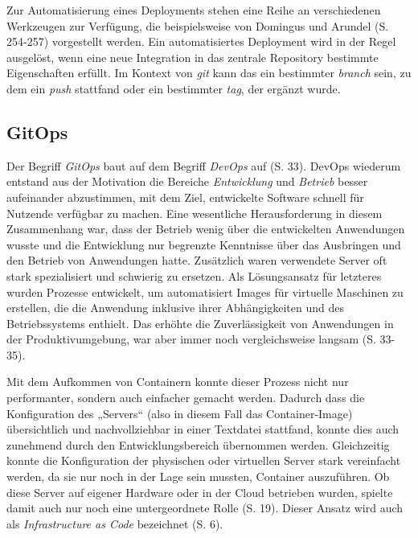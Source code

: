 \documentclass[11pt,a4paper]{article}
\begin{document}
Zur Automatisierung eines Deployments stehen eine Reihe an verschiedenen Werkzeugen
zur Verfügung, die beispielsweise von Domingus und Arundel \cite{domingus2022cloud} (S. 254-257)
vorgestellt werden. Ein automatisiertes Deployment wird in der Regel ausgelöst,
wenn eine neue Integration in das zentrale Repository bestimmte Eigenschaften erfüllt.
Im Kontext von \emph{git} kann das ein bestimmter \emph{branch} sein, zu dem
ein \emph{push} stattfand oder ein bestimmter \emph{tag}, der ergänzt wurde.

\subsection{GitOps}
Der Begriff \emph{GitOps} baut auf dem Begriff \emph{DevOps} auf \cite{cicd_with_kubernetes_devops} (S. 33).
DevOps wiederum entstand aus der Motivation die Bereiche \emph{Entwicklung} und \emph{Betrieb}
besser aufeinander abzustimmen, mit dem Ziel, entwickelte Software schnell
für Nutzende verfügbar zu machen. Eine wesentliche Herausforderung in diesem Zusammenhang
war, dass der Betrieb wenig über die entwickelten Anwendungen wusste und
die Entwicklung nur begrenzte Kenntnisse über das Ausbringen und den Betrieb von Anwendungen hatte.
Zusätzlich waren verwendete Server oft stark spezialisiert und schwierig zu ersetzen.
Als Lösungsansatz für letzteres wurden Prozesse entwickelt, um automatisiert Images
für virtuelle Maschinen zu erstellen, die die Anwendung inklusive ihrer Abhängigkeiten
und des Betriebssystems enthielt. Das erhöhte die Zuverlässigkeit von
Anwendungen in der Produktivumgebung, war aber immer noch vergleichsweise langsam \cite{cicd_with_kubernetes_devops} (S. 33-35).

Mit dem Aufkommen von Containern konnte dieser Prozess nicht nur performanter, sondern
auch einfacher gemacht werden. Dadurch dass die Konfiguration des „Servers“ (also in diesem
Fall das Container-Image) übersichtlich und nachvollziehbar in einer Textdatei stattfand,
konnte dies auch zunehmend durch den Entwicklungsbereich übernommen werden.
Gleichzeitig konnte die Konfiguration der physischen oder virtuellen Server
stark vereinfacht werden, da sie nur noch in der Lage sein mussten, Container auszuführen.
Ob diese Server auf eigener Hardware oder in der Cloud betrieben wurden, spielte damit auch nur
noch eine untergeordnete Rolle \cite{cicd_with_kubernetes_devops} (S. 19).
Dieser Ansatz wird auch als \emph{Infrastructure as Code} bezeichnet \cite{domingus2022cloud} (S. 6).
\end{document}
